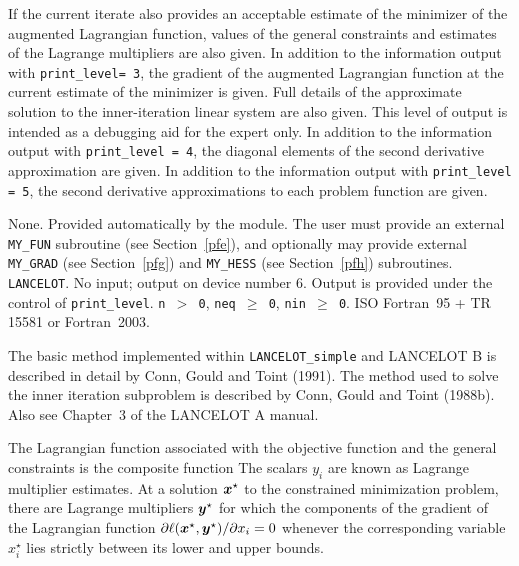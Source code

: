 \documentclass{galahad}
\newcommand{\packagename}{LANCELOT\_simple}
\begin{document}
\begin{description}
                 If the current iterate also provides an acceptable
                 estimate of the minimizer of the augmented Lagrangian
                 function, values of the general constraints and
                 estimates of the Lagrange multipliers are also given.
 In addition to the information output with
                 {\tt print\_level= 3},
                 the gradient of the augmented Lagrangian function at
                 the current estimate of the minimizer is given.
                 Full details of the approximate solution
                 to the inner-iteration linear system are also given.
                 This level of output is intended as a debugging aid
                 for the expert only.
 In addition to the information output with
                 {\tt print\_level = 4},
                 the diagonal elements of the second derivative
                 approximation are given.
 In addition to the information output with
                  {\tt print\_level = 5},
                  the second derivative approximations
                  to each problem function are given.
\end{description}


\galgeneral

\galcommon None.
\galworkspace Provided automatically by the module.
\galroutines The user must provide an external {\tt MY\_FUN} subroutine
(see Section~\ref{pfe}), and optionally may provide
external {\tt MY\_GRAD} (see Section~\ref{pfg}) and
{\tt MY\_HESS} (see Section~\ref{pfh}) subroutines.
\galmodules
{\tt LANCELOT}.
\galio No input; output on device number 6.
    Output is provided under the control of {\tt print\_level}.
\galrestrictions
     {\tt n $>$ 0},
     {\tt neq $\geq$ 0},
     {\tt nin $\geq$ 0}.
\galportability ISO Fortran~95 + TR 15581 or Fortran~2003.


\galmethod
The basic method implemented within {\tt \packagename} and LANCELOT B is
described in detail by Conn, Gould and Toint (1991).  The method used to solve
the inner iteration subproblem is described by Conn, Gould and Toint
(1988b).  Also see Chapter~3 of the {\sf LANCELOT A} manual.

The Lagrangian function associated with the objective function
and the general constraints is the
composite function   The scalars $y_i$ are known as Lagrange
multiplier estimates.  At a solution ${\bm{x}}^{\star}$ to the constrained
minimization problem, there are Lagrange multipliers ${\bm{y}}^{\star}$ for
which the components of the gradient of the Lagrangian function
$\partial \ell({\bm{x}}^{\star}, {\bm{y}}^{\star}) / \partial x_i= 0$ whenever
the corresponding variable $x_i^{\star}$ lies strictly between its lower
and upper bounds.
\end{document}
